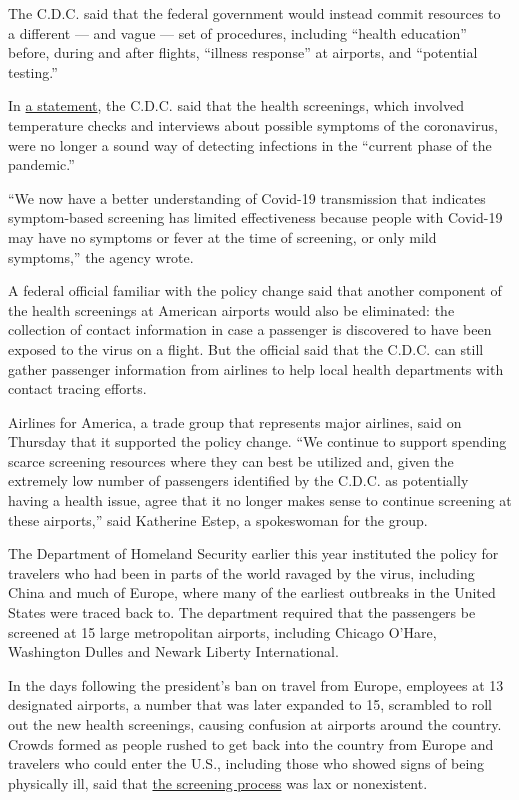 The C.D.C. said that the federal government would instead commit
resources to a different --- and vague --- set of procedures, including
``health education'' before, during and after flights, ``illness
response'' at airports, and ``potential testing.''

In
\href{https://www.cdc.gov/media/releases/2020/s-0909-covid-19-entry-strategy-air-passengers.html}{a
statement}, the C.D.C. said that the health screenings, which involved
temperature checks and interviews about possible symptoms of the
coronavirus, were no longer a sound way of detecting infections in the
``current phase of the pandemic.''

``We now have a better understanding of Covid-19 transmission that
indicates symptom-based screening has limited effectiveness because
people with Covid-19 may have no symptoms or fever at the time of
screening, or only mild symptoms,'' the agency wrote.

A federal official familiar with the policy change said that another
component of the health screenings at American airports would also be
eliminated: the collection of contact information in case a passenger is
discovered to have been exposed to the virus on a flight. But the
official said that the C.D.C. can still gather passenger information
from airlines to help local health departments with contact tracing
efforts.

Airlines for America, a trade group that represents major airlines, said
on Thursday that it supported the policy change. ``We continue to
support spending scarce screening resources where they can best be
utilized and, given the extremely low number of passengers identified by
the C.D.C. as potentially having a health issue, agree that it no longer
makes sense to continue screening at these airports,'' said Katherine
Estep, a spokeswoman for the group.

The Department of Homeland Security earlier this year instituted the
policy for travelers who had been in parts of the world ravaged by the
virus, including China and much of Europe, where many of the earliest
outbreaks in the United States were traced back to. The department
required that the passengers be screened at 15 large metropolitan
airports, including Chicago O'Hare, Washington Dulles and Newark Liberty
International.

In the days following the president's ban on travel from Europe,
employees at 13 designated airports, a number that was later expanded to
15, scrambled to roll out the new health screenings, causing confusion
at airports around the country. Crowds formed as people rushed to get
back into the country from Europe and travelers who could enter the
U.S., including those who showed signs of being physically ill, said
that
\href{https://www.nytimes3xbfgragh.onion/2020/03/13/us/politics/coronavirus-travelers-screening.html}{the
screening process} was lax or nonexistent.


